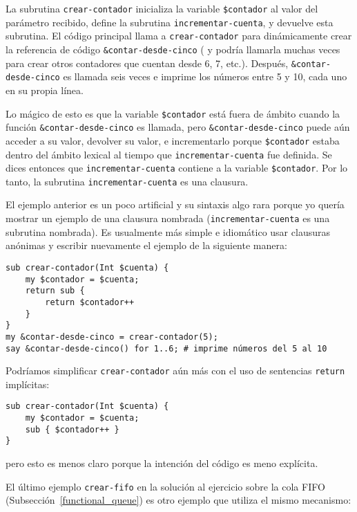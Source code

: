 La subrutina {\tt crear-contador} inicializa la variable
\verb|$contador| al valor del parámetro recibido, 
define la subrutina {\tt incrementar-cuenta}, y 
devuelve esta subrutina. El código principal llama a
{\tt crear-contador} para dinámicamente crear la 
referencia de código {\tt \&contar-desde-cinco} (
y podría llamarla muchas veces para crear otros 
contadores que cuentan desde 6, 7, etc.). Después,
\verb|&contar-desde-cinco| es llamada seis veces
e imprime los números entre 5 y 10, cada uno en su 
propia línea.

Lo mágico de esto es que la variable \verb|$contador| está fuera 
de ámbito cuando la función \verb|&contar-desde-cinco| es llamada, 
pero \verb|&contar-desde-cinco| puede aún acceder a su valor,
devolver su valor, e incrementarlo porque \verb|$contador| estaba
dentro del ámbito lexical al tiempo que {\tt incrementar-cuenta}
fue definida. Se dices entonces que {\tt incrementar-cuenta} 
contiene a la variable \verb|$contador|. Por lo tanto, 
la subrutina {\tt incrementar-cuenta} es una clausura.

El ejemplo anterior es un poco artificial y su sintaxis algo rara porque
yo quería mostrar un ejemplo de una clausura nombrada ({\tt incrementar-cuenta}
es una subrutina nombrada). Es usualmente más simple e idiomático
usar clausuras anónimas y escribir nuevamente el ejemplo
de la siguiente manera:


\begin{verbatim}
sub crear-contador(Int $cuenta) {
    my $contador = $cuenta;
    return sub {
        return $contador++
    }
}
my &contar-desde-cinco = crear-contador(5);
say &contar-desde-cinco() for 1..6; # imprime números del 5 al 10
\end{verbatim}

Podríamos simplificar {\tt crear-contador} aún más con el uso
de sentencias {\tt return} implícitas:

\begin{verbatim}
sub crear-contador(Int $cuenta) {
	my $contador = $cuenta;
	sub { $contador++ }
}
\end{verbatim}

pero esto es menos claro porque la intención del código es meno
explícita.

El último ejemplo {\tt crear-fifo} en la solución al ejercicio sobre
la cola FIFO (Subsección~\ref{functional_queue}) es otro ejemplo
que utiliza el mismo mecanismo:

